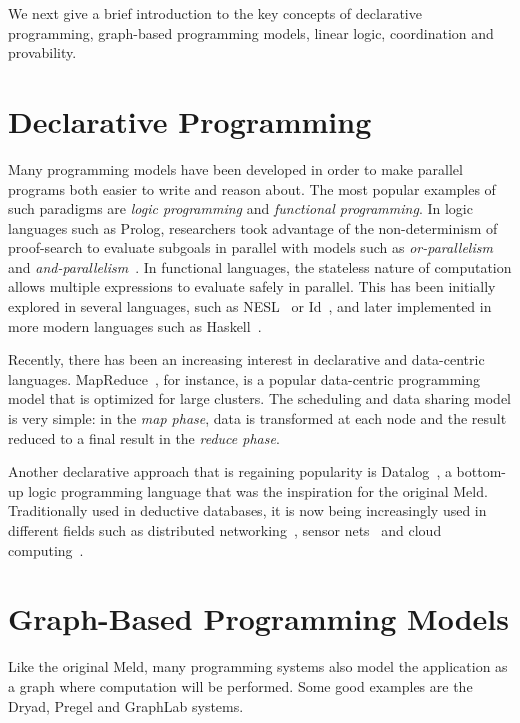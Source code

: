 We next give a brief introduction to the key concepts of declarative programming, graph-based programming models,
linear logic, coordination and provability.

\section{Declarative Programming}

Many programming models have been developed in order to make parallel programs both easier to write and reason about. The most popular examples of such paradigms are \emph{logic programming} and \emph{functional programming}.
In logic languages such as Prolog, researchers took advantage of the non-determinism of proof-search to evaluate subgoals
in parallel with models such as \emph{or-parallelism} and \emph{and-parallelism}~\cite{Gupta:2001:PEP:504083.504085}.
In functional languages, the stateless nature of computation allows multiple expressions to evaluate safely in parallel.
This has been initially explored in several languages, such as NESL~\cite{Blelloch:1996:PPA:227234.227246} or Id~\cite{Nikhil93anoverview}, and later implemented in more modern languages such as Haskell~\cite{Chakravarty07dataparallel}.

Recently, there has been an increasing interest in declarative and data-centric languages.
MapReduce~\cite{Dean:2008:MSD:1327452.1327492}, for instance, is a popular data-centric programming
model that is optimized for large clusters. The scheduling and data sharing model is very simple:
in the \emph{map phase}, data is transformed at each node and the result reduced to a final
result in the \emph{reduce phase}.

Another declarative approach that is regaining popularity is Datalog~\cite{Ullman:1990:PDK:533142}, a
bottom-up logic programming language that was the inspiration for the original Meld.
Traditionally used in deductive databases, it is now being increasingly used in different fields
such as distributed networking~\cite{Loo-condie-garofalakis-p2}, sensor
nets~\cite{Chu:2007:DID:1322263.1322281} and cloud computing~\cite{alvaro:boom}.

\section{Graph-Based Programming Models}

Like the original Meld, many programming systems also model the application as a graph where computation will be performed.
Some good examples are the Dryad, Pregel and GraphLab systems.

